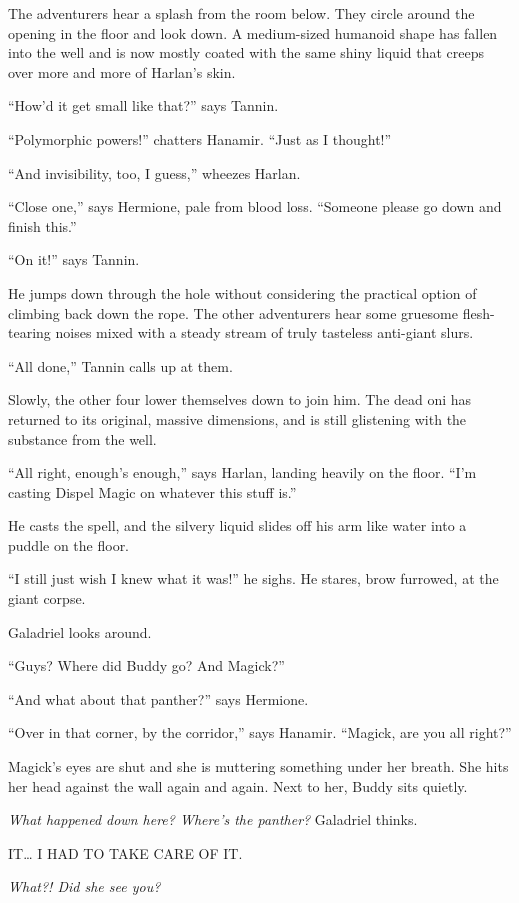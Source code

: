\documentclass[smalldemyvopaper,11pt,twoside,onecolumn,openright,extrafontsizes]{memoir}
\begin{document}
The adventurers hear a splash from the room below. They circle around
the opening in the floor and look down. A medium-sized humanoid shape
has fallen into the well and is now mostly coated with the same shiny
liquid that creeps over more and more of Harlan's skin.

``How'd it get small like that?'' says Tannin.

``Polymorphic powers!'' chatters Hanamir. ``Just as I thought!''

``And invisibility, too, I guess,'' wheezes Harlan.

``Close one,'' says Hermione, pale from blood loss. ``Someone please go
down and finish this.''

``On it!'' says Tannin.

He jumps down through the hole without considering the practical option
of climbing back down the rope. The other adventurers hear some gruesome
flesh-tearing noises mixed with a steady stream of truly tasteless
anti-giant slurs.

``All done,'' Tannin calls up at them.

Slowly, the other four lower themselves down to join him. The dead oni
has returned to its original, massive dimensions, and is still
glistening with the substance from the well.

``All right, enough's enough,'' says Harlan, landing heavily on the
floor. ``I'm casting Dispel Magic on whatever this stuff is.''

He casts the spell, and the silvery liquid slides off his arm like water
into a puddle on the floor.

``I still just wish I knew what it was!'' he sighs. He stares, brow
furrowed, at the giant corpse.

Galadriel looks around.

``Guys? Where did Buddy go? And Magick?''

``And what about that panther?'' says Hermione.

``Over in that corner, by the corridor,'' says Hanamir. ``Magick, are
you all right?''

Magick's eyes are shut and she is muttering something under her breath.
She hits her head against the wall again and again. Next to her, Buddy
sits quietly.

\emph{What happened down here? Where's the panther?} Galadriel thinks.

IT\ldots{} I HAD TO TAKE CARE OF IT.

\emph{What?! Did she see you?}
\end{document}
